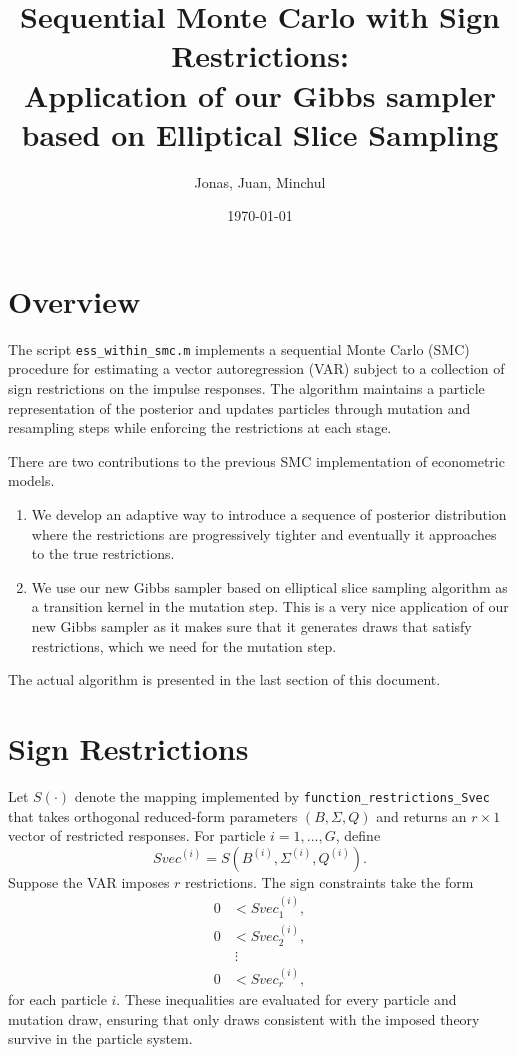 \documentclass[11pt]{article}
\title{Sequential Monte Carlo with Sign Restrictions: \\ Application of our Gibbs sampler based on Elliptical Slice Sampling}
\author{Jonas, Juan, Minchul}
\date{\today}
\begin{document}
\maketitle

\section{Overview}
The script \texttt{ess\_within\_smc.m} implements a sequential Monte Carlo (SMC) procedure for estimating a vector autoregression (VAR) subject to a collection of sign restrictions on the impulse responses. The algorithm maintains a particle representation of the posterior and updates particles through mutation and resampling steps while enforcing the restrictions at each stage.

\bigskip
\noindent There are two contributions to the previous SMC implementation of econometric models.

\begin{enumerate}
\item  We develop an adaptive way to introduce a sequence of posterior distribution where the restrictions are progressively tighter and eventually it approaches to the true restrictions.
\item  We use our new Gibbs sampler based on elliptical slice sampling algorithm as a transition kernel in the mutation step. This is a very nice application of our new Gibbs sampler as it makes sure that it generates draws that satisfy restrictions, which we need for the mutation step.
\end{enumerate}

\bigskip
The actual algorithm is presented in the last section of this document.



\section{Sign Restrictions}
Let $S(\cdot)$ denote the mapping implemented by \texttt{function\_restrictions\_Svec} that takes orthogonal reduced-form parameters $(B,\Sigma,Q)$ and returns an $r \times 1$ vector of restricted responses. For particle $i=1,\ldots,G$, define
\[
Svec^{(i)} = S\!\left(B^{(i)},\Sigma^{(i)},Q^{(i)}\right).
\]
Suppose the VAR imposes $r$ restrictions. The sign constraints take the form
\begin{align*}
0 &< Svec^{(i)}_1, \\
0 &< Svec^{(i)}_2, \\
&\ \vdots \\
0 &< Svec^{(i)}_r,
\end{align*}
for each particle $i$. These inequalities are evaluated for every particle and mutation draw, ensuring that only draws consistent with the imposed theory survive in the particle system.
\end{document}
